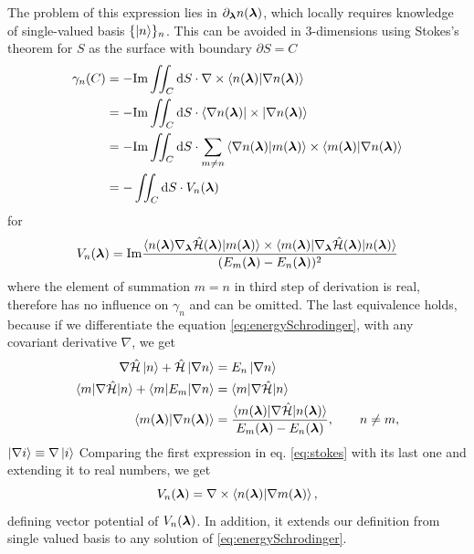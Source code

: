 The problem of this expression lies in $\partial_{\bm\lambda} n({\bm\lambda})$, which locally requires knowledge of single-valued basis $\{\ket{n}\}_n$. This can be avoided in 3-dimensions using Stokes's theorem for $S$ as the surface with boundary $\partial S=C$
\begin{equation}
    \begin{split}
        \gamma_n(C) &= -\textrm{Im} \iint_C \mathrm{d} S \cdot \nabla \times \braket{n({\bm\lambda})|\nabla n({\bm\lambda})}\\
         &= -\textrm{Im} \iint_C \mathrm{d} S \cdot \braket{\nabla n({\bm\lambda})|\times|\nabla n({\bm\lambda})}\\
        &= -\textrm{Im} \iint_C \mathrm{d} S \cdot \sum_{m\neq n} \braket{\nabla n({\bm\lambda})|m({\bm\lambda})}\times \braket{m({\bm\lambda})|\nabla n({\bm\lambda})}\\
        &= -\iint_C \mathrm{d} S \cdot V_n({\bm\lambda})
            \label{eq:stokes}
    \end{split}
\end{equation}
for 
\begin{equation}
    V_n({\bm\lambda}) = \textrm{Im} \frac{
            \braket{n({\bm\lambda})\nabla_{\bm\lambda} \hat{\mathcal{H}}({\bm\lambda}) |m({\bm\lambda})}\times \braket{m({\bm\lambda})|\nabla_{\bm\lambda} \hat{\mathcal{H}}({\bm\lambda})|n({\bm\lambda})}    
             }{
(E_m({\bm\lambda})-E_n({\bm\lambda}))^2
            }
\end{equation}
where the element of summation $m=n$ in third step of derivation is real, therefore has no influence on $\gamma_n$ and can be omitted. The last equivalence holds, because if we differentiate the \Schrodinger equation \ref{eq:energySchrodinger},  with any covariant derivative $\nabla$, we get 
\begin{equation}
    \begin{split}
        \nabla \hat{\mathcal{H}}\ket{n}+\hat{\mathcal{H}} \ket{\nabla n} &= E_n\ket{\nabla n}\\
        \braket{m|\nabla \hat{\mathcal{H}}|n}+\braket{m|E_m|\nabla n} &= \braket{m|\nabla \hat{\mathcal{H}}|n}\\
        \braket{m({\bm\lambda})|\nabla n({\bm\lambda})}&=
        \frac{\braket{m({\bm\lambda})|\nabla \hat{\mathcal{H}} |n({\bm\lambda})}}
        { E_m({\bm\lambda})-E_n({\bm\lambda})}, \qquad n\neq m,
    \end{split}
\end{equation}
$\ket{\nabla i}\equiv\nabla \ket{ i}$
Comparing the first expression in eq. \ref{eq:stokes} with its last one and extending it to real numbers, we get
\begin{equation}
    V_n({\bm\lambda})=\nabla\times\braket{n({\bm\lambda})|\nabla m({\bm\lambda})}, 
    \label{eq:vectorPotentialDef}  
\end{equation}
defining vector potential of $V_n({\bm\lambda})$. In addition, it extends our definition from single valued basis to any solution of \ref{eq:energySchrodinger}.

